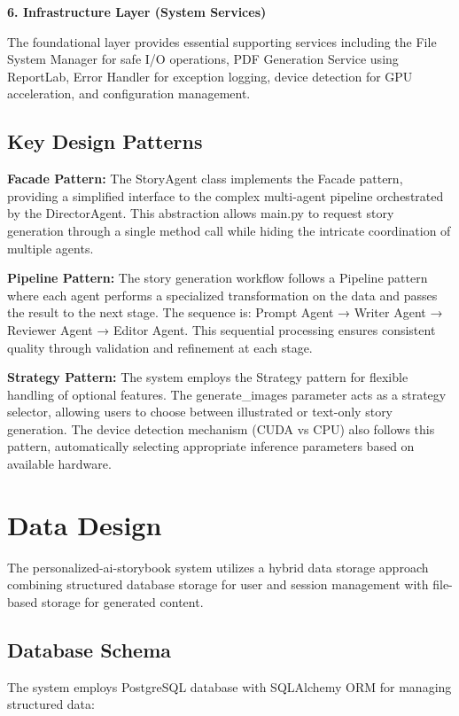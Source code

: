 \textbf{6. Infrastructure Layer (System Services)}

The foundational layer provides essential supporting services including the File System Manager for safe I/O operations, PDF Generation Service using ReportLab, Error Handler for exception logging, device detection for GPU acceleration, and configuration management.

\subsection{Key Design Patterns}

\textbf{Facade Pattern:} The StoryAgent class implements the Facade pattern, providing a simplified interface to the complex multi-agent pipeline orchestrated by the DirectorAgent. This abstraction allows main.py to request story generation through a single method call while hiding the intricate coordination of multiple agents.

\textbf{Pipeline Pattern:} The story generation workflow follows a Pipeline pattern where each agent performs a specialized transformation on the data and passes the result to the next stage. The sequence is: Prompt Agent → Writer Agent → Reviewer Agent → Editor Agent. This sequential processing ensures consistent quality through validation and refinement at each stage.

\textbf{Strategy Pattern:} The system employs the Strategy pattern for flexible handling of optional features. The generate\_images parameter acts as a strategy selector, allowing users to choose between illustrated or text-only story generation. The device detection mechanism (CUDA vs CPU) also follows this pattern, automatically selecting appropriate inference parameters based on available hardware.

\section{Data Design}

The personalized-ai-storybook system utilizes a hybrid data storage approach combining structured database storage for user and session management with file-based storage for generated content.

\subsection{Database Schema}

The system employs PostgreSQL database with SQLAlchemy ORM for managing structured data:


